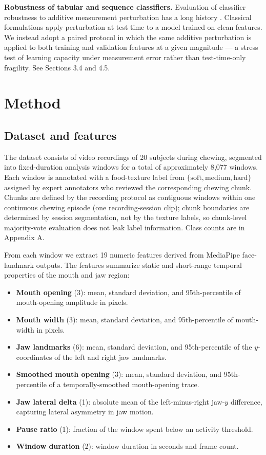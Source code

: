 \documentclass{article}
\begin{document}
\textbf{Robustness of tabular and sequence classifiers.} Evaluation of classifier robustness to additive measurement perturbation has a long history \cite{hendrycks2019,szegedy2014}. Classical formulations apply perturbation at test time to a model trained on clean features. We instead adopt a paired protocol in which the same additive perturbation is applied to both training and validation features at a given magnitude --- a stress test of learning capacity under measurement error rather than test-time-only fragility. See Sections 3.4 and 4.5.

\section{Method}

\subsection{Dataset and features}

The dataset consists of video recordings of 20 subjects during chewing, segmented into fixed-duration analysis windows for a total of approximately 8,077 windows. Each window is annotated with a food-texture label from $\{\text{soft}, \text{medium}, \text{hard}\}$ assigned by expert annotators who reviewed the corresponding chewing chunk. Chunks are defined by the recording protocol as contiguous windows within one continuous chewing episode (one recording-session clip); chunk boundaries are determined by session segmentation, not by the texture labels, so chunk-level majority-vote evaluation does not leak label information. Class counts are in Appendix A.

From each window we extract 19 numeric features derived from MediaPipe face-landmark outputs. The features summarize static and short-range temporal properties of the mouth and jaw region:

\begin{itemize}
    \item \textbf{Mouth opening} (3): mean, standard deviation, and 95th-percentile of mouth-opening amplitude in pixels.
    \item \textbf{Mouth width} (3): mean, standard deviation, and 95th-percentile of mouth-width in pixels.
    \item \textbf{Jaw landmarks} (6): mean, standard deviation, and 95th-percentile of the $y$-coordinates of the left and right jaw landmarks.
    \item \textbf{Smoothed mouth opening} (3): mean, standard deviation, and 95th-percentile of a temporally-smoothed mouth-opening trace.
    \item \textbf{Jaw lateral delta} (1): absolute mean of the left-minus-right jaw-$y$ difference, capturing lateral asymmetry in jaw motion.
    \item \textbf{Pause ratio} (1): fraction of the window spent below an activity threshold.
    \item \textbf{Window duration} (2): window duration in seconds and frame count.
\end{itemize}
\end{document}

